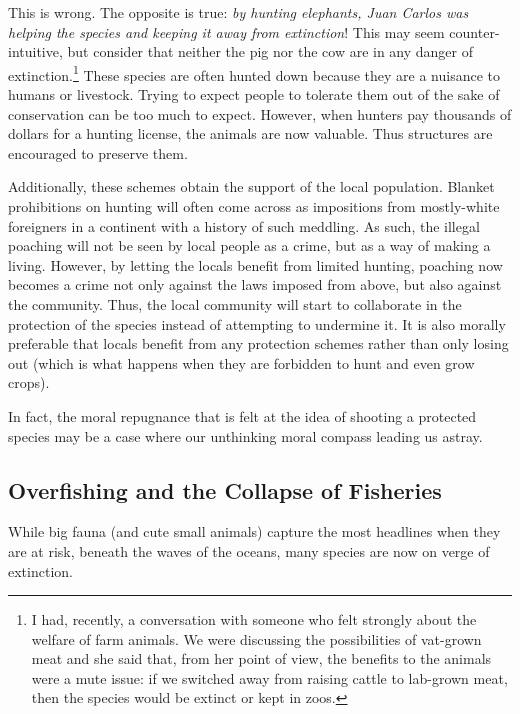 This is wrong. The opposite is true: \emph{by hunting elephants, Juan Carlos
was helping the species and keeping it away from extinction}! This may seem
counter-intuitive, but consider that neither the pig nor the cow are in any
danger of extinction.\footnote{I had, recently, a conversation with someone who
felt strongly about the welfare of farm animals. We were discussing the
possibilities of vat-grown meat and she said that, from her point of view, the
benefits to the animals were a mute issue: if we switched away from raising
cattle to lab-grown meat, then the species would be extinct or kept in zoos.}
These species are often hunted down because they are a nuisance to humans or
livestock. Trying to expect people to tolerate them out of the sake of
conservation can be too much to expect. However, when hunters pay thousands of
dollars for a hunting license, the animals are now valuable. Thus structures
are encouraged to preserve them.

Additionally, these schemes obtain the support of the local population. Blanket
prohibitions on hunting will often come across as impositions from mostly-white
foreigners in a continent with a history of such meddling. As such, the illegal
poaching will not be seen by local people as a crime, but as a way of making a
living. However, by letting the locals benefit from limited hunting, poaching
now becomes a crime not only against the laws imposed from above, but also
against the community. Thus, the local community will start to collaborate in
the protection of the species instead of attempting to undermine it. It is also
morally preferable that locals benefit from any protection schemes rather than
only losing out (which is what happens when they are forbidden to hunt and even
grow crops).


In fact, the moral repugnance that is felt at the idea of shooting a protected
species may be a case where our unthinking moral compass leading us astray.

\subsection{Overfishing and the Collapse of Fisheries}

While big fauna (and cute small animals) capture the most headlines when they
are at risk, beneath the waves of the oceans, many species are now on verge of
extinction.

